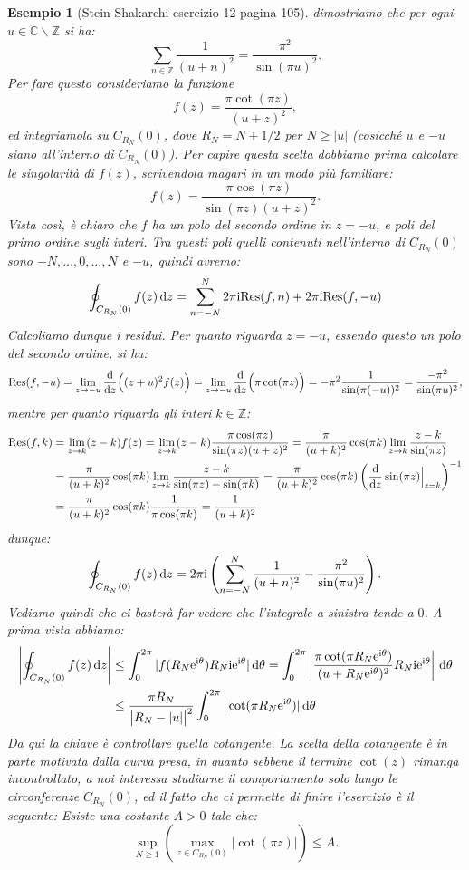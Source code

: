 \documentclass[11pt]{book}
\theoremstyle{Definizione}
\theoremstyle{TeoremaProposizioneLemmaCorollarioCongettura}
\theoremstyle{OsservazioneNotaEsempio}
\newtheorem{myes}{Esempio}[section]
\newcommand{\Z}{\mathbb{Z}}
\newcommand{\C}{\mathbb{C}}
\newcommand{\tolto}{\smallsetminus}
\renewcommand{\i}{\textup{i}}
\newcommand{\e}{\textup{e}}
\renewcommand{\d}{\mathrm{d}}
\newcommand{\dz}{\,\d z}
\newcommand{\dtheta}{\, \d \theta}
\newcommand{\Res}{\textup{Res}}
\begin{document}
\begin{myes}[Stein-Shakarchi esercizio 12 pagina 105]\label{es:SteinShakarchiEs12pag105}
dimostriamo che per ogni $u\in \C\tolto \Z$ si ha:
$$
\sum_{n\in \Z} \frac{1}{(u+n)^2} = \frac{\pi^2}{\sin(\pi u)^2}.
$$
Per fare questo consideriamo la funzione
$$
f(z) = \frac{\pi \cot(\pi z)}{(u+z)^2},
$$
ed integriamola su $C_{R_N}(0)$, dove $R_N = N+1/2$ per $N \geq |u|$ (cosicché $u$ e $-u$ siano all'interno di $C_{R_N}(0)$). Per capire questa scelta dobbiamo prima calcolare le singolarità di $f(z)$, scrivendola magari in un modo più familiare:
$$
f(z) = \frac{\pi \cos(\pi z)}{\sin(\pi z)(u+z)^2}.
$$
Vista così, è chiaro che $f$ ha un polo del secondo ordine in $z = -u$, e poli del primo ordine sugli interi. Tra questi poli quelli contenuti nell'interno di $C_{R_N}(0)$ sono $-N,\dots,0,\dots,N$ e $-u$, quindi avremo:
$$
\oint_{C_{R_N}(0)} f(z) \dz = \sum_{n = -N}^{N} 2\pi \i \Res(f,n) + 2\pi \i \Res(f,-u)
$$
Calcoliamo dunque i residui. Per quanto riguarda $z = -u$, essendo questo un polo del secondo ordine, si ha:
$$
\Res(f,-u) = \lim_{z \to -u} \frac{\d}{\d z}\Big((z+u)^2f(z)\Big) = \lim_{z\to -u} \frac{\d}{\d z}\Big(\pi \cot(\pi z)\Big) = -\pi^2\frac{1}{\sin(\pi(-u))^2} = \frac{-\pi^2}{\sin(\pi u)^2},
$$
mentre per quanto riguarda gli interi $k\in \Z$:
\begin{align*}
\Res(f,k) &= \lim_{z\to k} (z-k)f(z) = \lim_{z\to k} (z-k) \frac{\pi \cos(\pi z)}{\sin(\pi z) (u+z)^2} = \frac{\pi}{(u+k)^2}\cos(\pi k)\lim_{z\to k} \frac{z-k}{\sin(\pi z)} \\
&= \frac{\pi}{(u+k)^2}\cos(\pi k) \lim_{z\to k} \frac{z-k}{\sin(\pi z)-\sin(\pi k)} = \frac{\pi}{(u+k)^2}\cos(\pi k)\left(\frac{\d}{\d z} \sin(\pi z)\Big|_{z = k}\right)^{-1} \\
&=\frac{\pi}{(u+k)^2} \cos(\pi k) \frac{1}{\pi\cos(\pi k)} = \frac{1}{(u+k)^2}
\end{align*}
dunque:
$$
\oint_{C_{R_N}(0)} f(z) \dz = 2\pi\i\left(\sum_{n = -N}^{N} \frac{1}{(u+n)^2} - \frac{\pi^2}{\sin(\pi u)^2}\right).
$$
Vediamo quindi che ci basterà far vedere che l'integrale a sinistra tende a $0$. A prima vista abbiamo:
\begin{align*}
\left|\oint_{C_{R_N}(0)} f(z) \dz\right| &\leq \int_0^{2\pi} |f(R_N\e^{\i\theta})R_N\i\e^{\i\theta}|\dtheta = \int_0^{2\pi} \left|\frac{\pi \cot(\pi R_N\e^{\i\theta})}{(u+R_N\e^{\i\theta})^2}R_N\i\e^{\i\theta}\right|\dtheta\\
&\leq \frac{\pi R_N}{\big|R_N-|u|\big|^2}\int_0^{2\pi} |\cot(\pi R_N\e^{\i\theta})|\dtheta
\end{align*}
Da qui la chiave è controllare quella cotangente. La scelta della cotangente è in parte motivata dalla curva presa, in quanto sebbene il termine $\cot(z)$ rimanga incontrollato, a noi interessa studiarne il comportamento solo lungo le circonferenze $C_{R_N}(0)$, ed il fatto che ci permette di finire l'esercizio è il seguente: Esiste una costante $A >0$ tale che:
$$
\sup_{N \geq 1} \left(\max_{z\in C_{R_N}(0)} |\cot(\pi z)|\right)\leq A.
$$
\end{myes}
\end{document}
